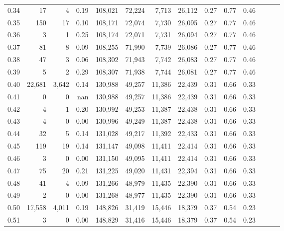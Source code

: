 \begin{tabular}{rrrrrrrrrrrrrr}
0.34 &      17 &      4 &  0.19 &  108,021 &   72,224 &   7,713 &  26,112 &  0.27 &  0.77 &      0.46 \\
0.35 &     150 &     17 &  0.10 &  108,171 &   72,074 &   7,730 &  26,095 &  0.27 &  0.77 &      0.46 \\
0.36 &       3 &      1 &  0.25 &  108,174 &   72,071 &   7,731 &  26,094 &  0.27 &  0.77 &      0.46 \\
0.37 &      81 &      8 &  0.09 &  108,255 &   71,990 &   7,739 &  26,086 &  0.27 &  0.77 &      0.46 \\
0.38 &      47 &      3 &  0.06 &  108,302 &   71,943 &   7,742 &  26,083 &  0.27 &  0.77 &      0.46 \\
0.39 &       5 &      2 &  0.29 &  108,307 &   71,938 &   7,744 &  26,081 &  0.27 &  0.77 &      0.46 \\
0.40 &  22,681 &  3,642 &  0.14 &  130,988 &   49,257 &  11,386 &  22,439 &  0.31 &  0.66 &      0.33 \\
0.41 &       0 &      0 &   nan &  130,988 &   49,257 &  11,386 &  22,439 &  0.31 &  0.66 &      0.33 \\
0.42 &       4 &      1 &  0.20 &  130,992 &   49,253 &  11,387 &  22,438 &  0.31 &  0.66 &      0.33 \\
0.43 &       4 &      0 &  0.00 &  130,996 &   49,249 &  11,387 &  22,438 &  0.31 &  0.66 &      0.33 \\
0.44 &      32 &      5 &  0.14 &  131,028 &   49,217 &  11,392 &  22,433 &  0.31 &  0.66 &      0.33 \\
0.45 &     119 &     19 &  0.14 &  131,147 &   49,098 &  11,411 &  22,414 &  0.31 &  0.66 &      0.33 \\
0.46 &       3 &      0 &  0.00 &  131,150 &   49,095 &  11,411 &  22,414 &  0.31 &  0.66 &      0.33 \\
0.47 &      75 &     20 &  0.21 &  131,225 &   49,020 &  11,431 &  22,394 &  0.31 &  0.66 &      0.33 \\
0.48 &      41 &      4 &  0.09 &  131,266 &   48,979 &  11,435 &  22,390 &  0.31 &  0.66 &      0.33 \\
0.49 &       2 &      0 &  0.00 &  131,268 &   48,977 &  11,435 &  22,390 &  0.31 &  0.66 &      0.33 \\
0.50 &  17,558 &  4,011 &  0.19 &  148,826 &   31,419 &  15,446 &  18,379 &  0.37 &  0.54 &      0.23 \\
0.51 &       3 &      0 &  0.00 &  148,829 &   31,416 &  15,446 &  18,379 &  0.37 &  0.54 &      0.23 \\

\end{tabular}
